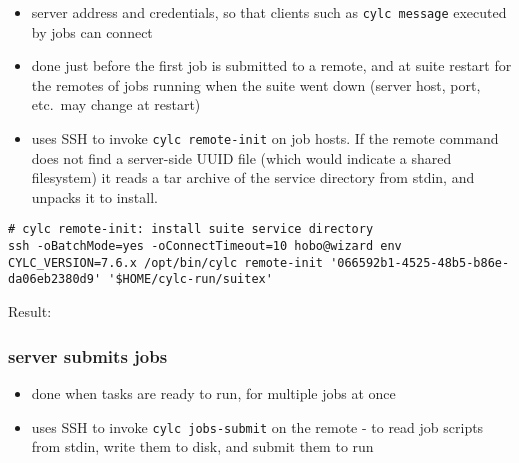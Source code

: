 \begin{itemize}
  \item server address and credentials, so that clients such as
    \lstinline=cylc message=  executed by jobs can connect
  \item done just before the first job is submitted to a remote, and at
    suite restart for the remotes of jobs running when the suite went
    down (server host, port, etc.\ may change at restart)
  \item uses SSH to invoke \lstinline=cylc remote-init= on 
    job hosts. If the remote command does not find a server-side UUID file
    (which would indicate a shared filesystem) it reads a tar archive of
    the service directory from stdin, and unpacks it to install.
\end{itemize}

\lstset{language=jobhosts}

\vspace{5mm}
\begin{lstlisting}
# cylc remote-init: install suite service directory
ssh -oBatchMode=yes -oConnectTimeout=10 hobo@wizard env CYLC_VERSION=7.6.x /opt/bin/cylc remote-init '066592b1-4525-48b5-b86e-da06eb2380d9' '$HOME/cylc-run/suitex'
\end{lstlisting}

Result:
{\scriptsize
{}
}

\subsubsection{server submits jobs}
\begin{itemize}
  \item done when tasks are ready to run, for multiple jobs at once
  \item uses SSH to invoke \lstinline=cylc jobs-submit= on the
    remote - to read job scripts from stdin, write them to disk, and submit
    them to run
\end{itemize}

